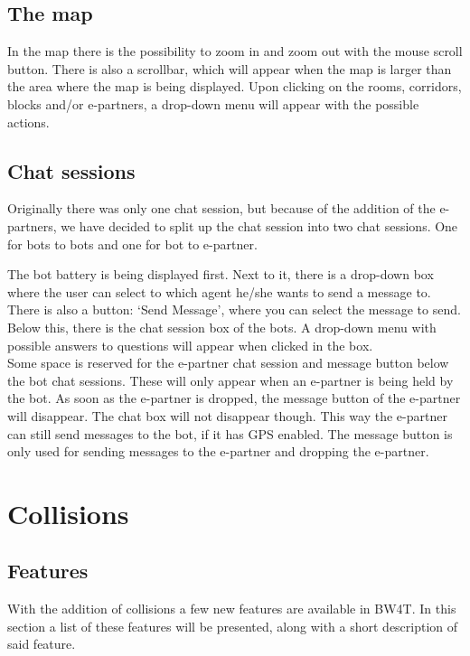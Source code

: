 \subsection*{The map}
In the map there is the possibility to zoom in and zoom out with the mouse scroll button. There is also a scrollbar, which will appear when the map is larger than the area where the map is being displayed. Upon clicking on the rooms, corridors, blocks and/or e-partners, a drop-down menu will appear with the possible actions.

\subsection*{Chat sessions}
Originally there was only one chat session, but because of the addition of the e-partners, we have decided to split up the chat session into two chat sessions. One for bots to bots and one for bot to e-partner.

The bot battery is being displayed first. Next to it, there is a drop-down box where the user can select to which agent he/she wants to send a message to. There is also a button: `Send Message', where you can select the message to send. Below this, there is the chat session box of the bots. A drop-down menu with possible answers to questions will appear when clicked in the box. \\

Some space is reserved for the e-partner chat session and message button below the bot chat sessions. These will only appear when an e-partner is being held by the bot. As soon as the e-partner is dropped, the message button of the e-partner will disappear. The chat box will not disappear though. This way the e-partner can still send messages to the bot, if it has GPS enabled. The message button is only used for sending messages to the e-partner and dropping the e-partner.

\section{Collisions}
\subsection*{Features}
With the addition of collisions a few new features are available in BW4T. In this section a list of these features will be presented, along with a short description of said feature.

